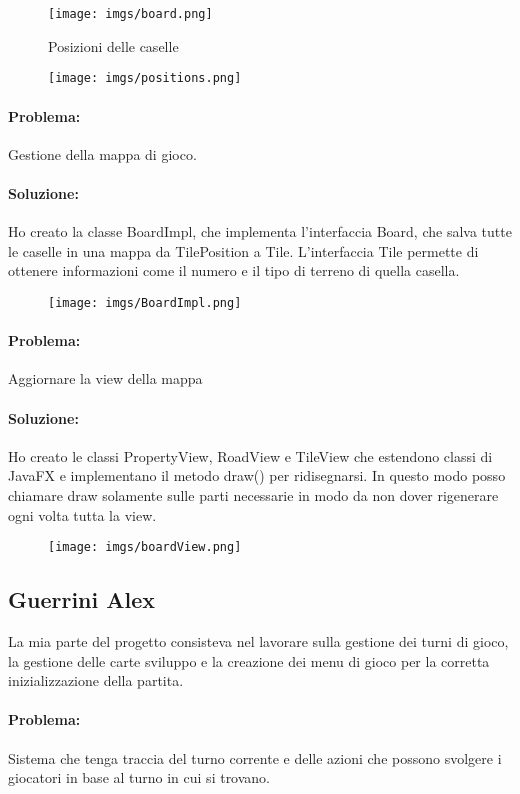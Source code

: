 \documentclass[a4paper,12pt]{report}
\begin{document}
\begin{figure}[H]
\centering{}
\texttt{[image: imgs/board.png]}
\caption{Posizioni delle caselle}
\label{img:analysis}
\end{figure}
\begin{figure}[H]
\centering{}
\texttt{[image: imgs/positions.png]}
\label{img:analysis}
\end{figure}
\paragraph{Problema:} Gestione della mappa di gioco.
\paragraph{Soluzione:} Ho creato la classe BoardImpl, che implementa l'interfaccia Board, che salva tutte le caselle in una mappa da TilePosition a Tile. L'interfaccia Tile permette di ottenere informazioni come il numero e il tipo di terreno di quella casella.
\begin{figure}[H]
\centering{}
\texttt{[image: imgs/BoardImpl.png]}
\label{img:analysis}
\end{figure}

\paragraph{Problema:} Aggiornare la view della mappa
\paragraph{Soluzione:} Ho creato le classi PropertyView, RoadView e TileView che estendono classi di JavaFX e implementano il metodo draw() per ridisegnarsi. In questo modo posso chiamare draw solamente sulle parti necessarie in modo da non dover rigenerare ogni volta tutta la view.
\begin{figure}[H]
\centering{}
\texttt{[image: imgs/boardView.png]}
\label{img:analysis}
\end{figure}
\subsection{Guerrini Alex}
La mia parte del progetto consisteva nel lavorare sulla gestione dei turni di gioco, la gestione delle carte sviluppo e la creazione dei menu di gioco per la corretta inizializzazione della partita.
\paragraph{Problema:}Sistema che tenga traccia del turno corrente e delle azioni che possono svolgere i giocatori in base al turno in cui si trovano.
\end{document}
